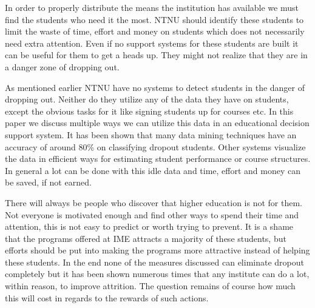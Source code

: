 \bigskip\noindent
In order to properly distribute the means the institution has available we must find the students who need it the most.
NTNU should identify these students to limit the waste of time, effort and money on students which does not necessarily need extra attention.
Even if no support systems for these students are built it can be useful for them to get a heads up.
They might not realize that they are in a danger zone of dropping out.

\bigskip\noindent
As mentioned earlier NTNU have no systems to detect students in the danger of dropping out.
Neither do they utilize any of the data they have on students, except the obvious tasks for it like signing students up for courses etc. 
In this paper we discuss multiple ways we can utilize this data in an educational decision support system.
It has been shown that many data mining techniques have an accuracy of around 80\% on classifying dropout students.
Other systems visualize the data in efficient ways for estimating student performance or course structures. 
In general a lot can be done with this idle data and time, effort and money can be saved, if not earned.

\bigskip\noindent
There will always be people who discover that higher education is not for them.
Not everyone is motivated enough and find other ways to spend their time and attention, this is not easy to predict or worth trying to prevent.
It is a shame that the programs offered at IME attracts a majority of these students, but efforts should be put into making the programs more attractive instead of helping these students. 
In the end none of the measures discussed can eliminate dropout completely but it has been shown numerous times that any institute can do a lot, within reason, to improve attrition. 
The question remains of course how much this will cost in regards to the rewards of such actions.